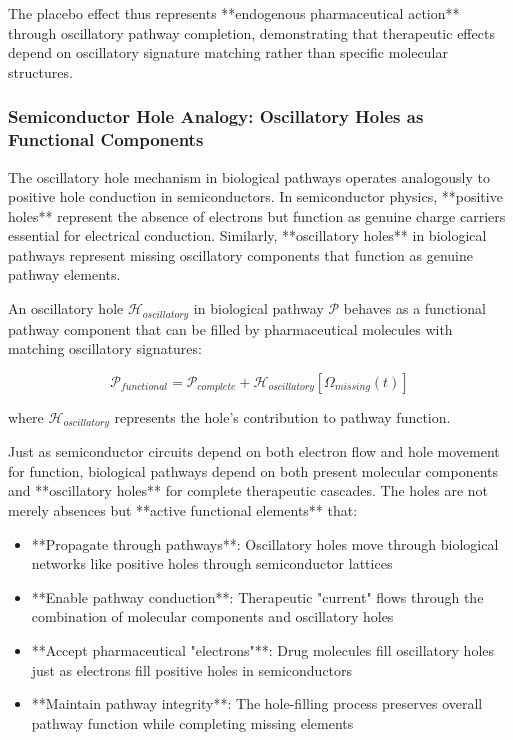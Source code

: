 The placebo effect thus represents **endogenous pharmaceutical action** through oscillatory pathway completion, demonstrating that therapeutic effects depend on oscillatory signature matching rather than specific molecular structures.

\subsubsection{Semiconductor Hole Analogy: Oscillatory Holes as Functional Components}

The oscillatory hole mechanism in biological pathways operates analogously to positive hole conduction in semiconductors. In semiconductor physics, **positive holes** represent the absence of electrons but function as genuine charge carriers essential for electrical conduction. Similarly, **oscillatory holes** in biological pathways represent missing oscillatory components that function as genuine pathway elements.

\begin{definition}
An oscillatory hole $\mathcal{H}_{oscillatory}$ in biological pathway $\mathcal{P}$ behaves as a functional pathway component that can be filled by pharmaceutical molecules with matching oscillatory signatures:

\begin{equation}
\mathcal{P}_{functional} = \mathcal{P}_{complete} + \mathcal{H}_{oscillatory}[\Omega_{missing}(t)]
\end{equation}

where $\mathcal{H}_{oscillatory}$ represents the hole's contribution to pathway function.
\end{definition}

Just as semiconductor circuits depend on both electron flow and hole movement for function, biological pathways depend on both present molecular components and **oscillatory holes** for complete therapeutic cascades. The holes are not merely absences but **active functional elements** that:

\begin{itemize}
\item **Propagate through pathways**: Oscillatory holes move through biological networks like positive holes through semiconductor lattices
\item **Enable pathway conduction**: Therapeutic "current" flows through the combination of molecular components and oscillatory holes
\item **Accept pharmaceutical "electrons"**: Drug molecules fill oscillatory holes just as electrons fill positive holes in semiconductors
\item **Maintain pathway integrity**: The hole-filling process preserves overall pathway function while completing missing elements
\end{itemize}

